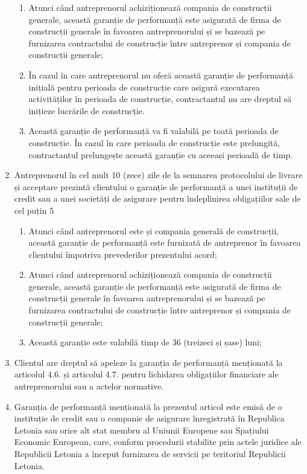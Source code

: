 \begin{multicols}{2}
\begin{enumerate}
\begin{enumerate}
\item Atunci când antreprenorul achiziționează compania de construcții generale, această garanție de performanță este asigurată de firma de construcții generale în favoarea antreprenorului și se bazează pe furnizarea contractului de construcție între antreprenor și compania de construcții generale;
\item În cazul în care antreprenorul nu oferă această garanție de performanță inițială pentru perioada de construcție care asigură executarea activităților în perioada de construcție, contractantul nu are dreptul să inițieze lucrările de construcție.
\item Această garanție de performanță va fi valabilă pe toată perioada de construcție. În cazul în care perioada de construcție este prelungită, contractantul prelungește această garanție cu aceeași perioadă de timp.
\end{enumerate}
\item Antreprenorul în cel mult 10 (zece) zile de la semnarea protocolului de livrare și acceptare prezintă clientului o garanție de performanță a unei instituții de credit sau a unei societăți de asigurare pentru îndeplinirea obligațiilor sale de cel puțin 5%
 \begin{enumerate}
\item Atunci când antreprenorul este și compania generală de construcții, această garanție de performanță este furnizată de antreprenor în favoarea clientului împotriva prevederilor prezentului acord;
\item Atunci când antreprenorul achiziționează compania de construcții generale, această garanție de performanță este asigurată de firma de construcții generale în favoarea antreprenorului și se bazează pe furnizarea contractului de construcție între antreprenor și compania de construcții generale;
\item Această garanție este valabilă timp de 36 (treizeci și șase) luni;
\end{enumerate}
\item Clientul are dreptul să apeleze la garanția de performanță menționată la articolul 4.6. și articolul 4.7. pentru lichidarea obligațiilor financiare ale antreprenorului sau a actelor normative.
\item Garanția de performanță menționată la prezentul articol este emisă de o instituție de credit sau o companie de asigurare înregistrată în Republica Letonia sau orice alt stat membru al Uniunii Europene sau Spațiului Economic European, care, conform procedurii stabilite prin actele juridice ale Republicii Letonia a început furnizarea de servicii pe teritoriul Republicii Letonia.
\end{enumerate}


\end{multicols}
